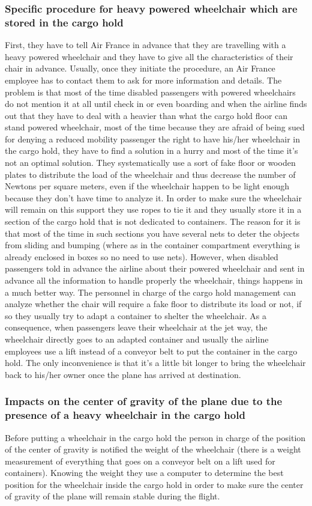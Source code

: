 \subsubsection{Specific procedure for heavy powered wheelchair which are stored in the cargo hold}
First, they have to tell Air France in advance that they are travelling with a heavy powered wheelchair and they have to give all the characteristics of their chair in advance. Usually, once they initiate the procedure, an Air France employee has to contact them to ask for more information and details.
The problem is that most of the time disabled passengers with powered wheelchairs do not mention it at all until check in or even boarding and when the airline finds out that they have to deal with a heavier than what the cargo hold floor can stand powered wheelchair, most of the time because they are afraid of being sued for denying a reduced mobility passenger the right to have his/her wheelchair in the cargo hold, they have to find a solution in a hurry and most of the time it’s not an optimal solution. They systematically use a sort of fake floor or wooden plates to distribute the load of the wheelchair and thus decrease the number of Newtons per square meters, even if the wheelchair happen to be light enough because they don’t have time to analyze it. In order to make sure the wheelchair will remain on this support they use ropes to tie it and they usually store it in a section of the cargo hold that is not dedicated to containers. The reason for it is that most of the time in such sections you have several nets to deter the objects from sliding and bumping (where as in the container compartment everything is already enclosed in boxes so no need to use nets).
However, when disabled passengers told in advance the airline about their powered wheelchair and sent in advance all the information to handle properly the wheelchair, things happens in a much better way. The personnel in charge of the cargo hold management can analyze whether the chair will require a fake floor to distribute its load or not, if so they usually try to adapt a container to shelter the wheelchair. As a consequence, when passengers leave their wheelchair at the jet way, the wheelchair directly goes to an adapted container and usually the airline employees use a lift instead of a conveyor belt to put the container in the cargo hold. The only inconvenience is that it’s a little bit longer to bring the wheelchair back to his/her owner once the plane has arrived at destination.

\subsubsection{Impacts on the center of gravity of the plane due to the presence of a heavy wheelchair in the cargo hold}
Before putting a wheelchair in the cargo hold the person in charge of the position of the center of gravity is notified the weight of the wheelchair (there is a weight measurement of everything that goes on a conveyor belt on a lift used for containers). Knowing the weight they use a computer to determine the best position for the wheelchair inside the cargo hold in order to make sure the center of gravity of the plane will remain stable during the flight.

